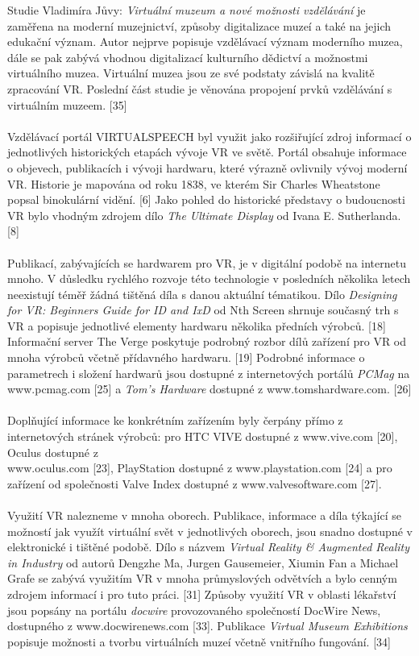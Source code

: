 \documentclass[a4paper, 12pt]{report}
\begin{document}
Studie Vladimíra Jůvy: \textit{Virtuální muzeum a nové možnosti
vzdělávání} je zaměřena na moderní muzejnictví, způsoby digitalizace muzeí a také na jejich edukační význam. Autor nejprve popisuje vzdělávací význam moderního muzea, dále se pak zabývá vhodnou digitalizací kulturního dědictví a možnostmi virtuálního muzea. Virtuální muzea jsou ze své podstaty závislá na kvalitě zpracování VR. Poslední část studie je věnována propojení prvků vzdělávání s virtuálním muzeem. [35]\\
\\
Vzdělávací portál VIRTUALSPEECH byl využit jako rozšiřující zdroj informací o jednotlivých historických etapách vývoje VR ve světě. Portál obsahuje informace o objevech, publikacích i vývoji hardwaru, které výrazně ovlivnily vývoj moderní VR. Historie je mapována od roku 1838, ve kterém Sir Charles Wheatstone popsal binokulární vidění. [6] Jako pohled do historické představy o budoucnosti VR bylo vhodným zdrojem dílo \textit{The Ultimate Display} od Ivana E. Sutherlanda. [8] \\
\\
Publikací, zabývajících se hardwarem pro VR, je v digitální podobě na internetu mnoho. V důsledku rychlého rozvoje této technologie v posledních několika letech neexistují téměř žádná tištěná díla s danou aktuální tématikou. Dílo \textit{Designing for VR: Beginners Guide for ID and IxD} od Nth Screen shrnuje současný trh s VR a popisuje jednotlivé elementy hardwaru několika předních výrobců. [18] Informační server The Verge poskytuje podrobný rozbor dílů zařízení pro VR od mnoha výrobců včetně přídavného hardwaru. [19] Podrobné informace o parametrech i složení hardwarů jsou dostupné z internetových portálů \textit{PCMag} na www.pcmag.com [25] a \textit{Tom's Hardware} dostupné z www.tomshardware.com. [26]\\
\\
Doplňující informace ke konkrétním zařízením byly čerpány přímo z internetových stránek výrobců: pro HTC VIVE dostupné z www.vive.com [20], Oculus dostupné z \\www.oculus.com [23], PlayStation dostupné z www.playstation.com [24] a pro zařízení od společnosti Valve Index dostupné z www.valvesoftware.com [27].\\
\\
Využití VR nalezneme v mnoha oborech. Publikace, informace a díla týkající se možností jak využít virtuální svět v jednotlivých oborech, jsou snadno dostupné v elektronické i tištěné podobě. Dílo s názvem \textit{Virtual Reality \& Augmented Reality in Industry} od autorů Dengzhe Ma, Jurgen Gausemeier, Xiumin Fan a Michael Grafe se zabývá využitím VR v mnoha průmyslových odvětvích a bylo cenným zdrojem informací i pro tuto práci. [31] Způsoby využití VR v oblasti lékařství jsou popsány na portálu \textit{docwire} provozovaného společností DocWire News, dostupného z www.docwirenews.com [33]. Publikace \textit{Virtual Museum Exhibitions} popisuje možnosti a tvorbu virtuálních muzeí včetně vnitřního fungování. [34]\\
\end{document}
